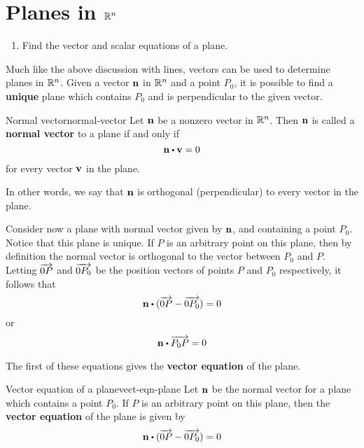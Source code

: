 \pagebreak
\section{Planes in $\mathbb{R}^n$}

\begin{outcome}

\begin{enumerate}

\item[A.] Find the vector and scalar equations of a plane.

\end{enumerate}
\end{outcome}

Much like the above discussion with lines, vectors can be used to determine planes in $\mathbb{R}^n$. Given a vector $\mbox{\bf n}$ in $\mathbb{R}^n$ and a point $P_0$, it is possible to find a \textbf{unique} plane which contains $P_0$ and is perpendicular to the given vector. 

\begin{definition}{Normal vector}{normal-vector}
Let $\mbox{\bf n}$ be a nonzero vector in $\mathbb{R}^n$. Then $\mbox{\bf n}$ is called a \textbf{normal vector} to a plane if and only if 
\[
\vect{n} \dotprod \vect{v} = 0
\]
for every vector $\mbox{\bf v}$ in the plane. 
\end{definition}

In other words, we say that $\mbox{\bf n}$ is orthogonal (perpendicular) to every vector in the plane. 

Consider now a plane with normal vector given by $\mbox{\bf n}$, and containing a point $P_0$. Notice that this plane is unique. If $P$ is an arbitrary point on this plane, then by definition the normal vector is orthogonal to the vector between $P_0$ and $P$. Letting $\overrightarrow{0P}$ and $\overrightarrow{0P_0}$ be the position vectors of points $P$ and $P_0$ respectively, it follows that 
\[
\vect{n} \dotprod (\longvect{0P} - \longvect{0P_0}) = 0 
\]
or
\[
\vect{n} \dotprod \longvect{P_0P} = 0 
\]

The first of these equations gives the \textbf{vector equation} of the plane. 

\begin{definition}{Vector equation of a plane}{vect-eqn-plane}
Let $\mbox{\bf n}$ be the normal vector for a plane which contains a point $P_0$. If $P$ is an arbitrary point on this plane, then the \textbf{vector equation} of the plane is given by 
\[
\vect{n} \dotprod (\longvect{0P} - \longvect{0P_0}) = 0
\]
\end{definition}

